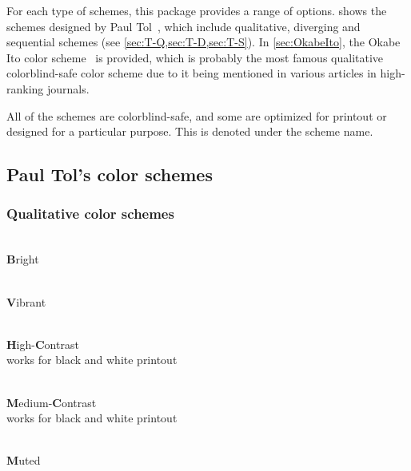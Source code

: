 \documentclass{scrartcl}
\begin{document}
For each type of schemes, this package provides a range of options.
 shows the schemes designed by Paul Tol~\cite{Tol}, which include qualitative, diverging and sequential schemes (see \cref{sec:T-Q,sec:T-D,sec:T-S}).
In \cref{sec:OkabeIto}, the Okabe Ito color scheme~\cite{Ichihara_2008} is provided, which is probably the most famous qualitative colorblind-safe color scheme due to it being mentioned in various articles in high-ranking journals.

All of the schemes are colorblind-safe, and some are optimized for printout or designed for a particular purpose.
This is denoted under the scheme name.\clearpage

\subsection{Paul Tol's color schemes}\label{sec:Tol_schemes}

\subsubsection{Qualitative color schemes}\label{sec:T-Q}
\begin{minipage}{0.5\textwidth}
    \centering
    \\
    \textbf{B}right\\
    \phantom{pb}
\end{minipage}\hfill%
\begin{minipage}{0.5\textwidth}
    \centering
    \\
    \textbf{V}ibrant
\end{minipage}

\begin{minipage}{0.5\textwidth}
    \centering
    \\
    \textbf{H}igh-\textbf{C}ontrast\\
    works for black and white printout
\end{minipage}\hfill%
\begin{minipage}{0.5\textwidth}
    \centering
    \\
    \textbf{M}edium-\textbf{C}ontrast\\
    works for black and white printout
\end{minipage}

\begin{center}
    \\
    \textbf{M}uted
\end{center}
\end{document}
